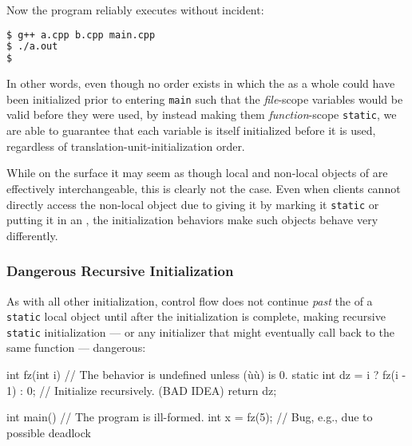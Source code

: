\noindent Now the program reliably executes without incident:

\begin{lstlisting}[language=bash]
$ g++ a.cpp b.cpp main.cpp
$ ./a.out
$
\end{lstlisting}

\noindent In other words, even though no order exists in which the 
as a whole could have been initialized prior to entering
\lstinline!main! such that the \emph{file}-scope variables
would be valid before they were used, by instead making them
\emph{function}-scope \lstinline!static!, we are able to guarantee that
each variable is itself initialized before it is used, regardless of
translation-unit-initialization order.

While on the surface it may seem as though local and non-local objects of 
are effectively interchangeable, this is clearly not the case.  Even when
clients cannot directly access the non-local object due to giving it
 by marking it \lstinline!static! or putting it in an ,
the initialization behaviors make such objects behave very differently.

\subsubsection[Dangerous Recursive Initialization]{Dangerous Recursive Initialization}\label{dangerous-recursive-initialization}

As with all other initialization, control flow does not continue
\emph{past} the  of a \lstinline!static! local object until
after the initialization is complete, making recursive \lstinline!static!
initialization --- or any initializer that might eventually call back to the same function --- dangerous:

\begin{emcppslisting}
int fz(int i)  // The behavior is undefined unless (ù{}ù) is 0.
{
    static int dz = i ? fz(i - 1) : 0;  // Initialize recursively. (BAD IDEA)
    return dz;
}

int main()  // The program is ill-formed.
{
    int x = fz(5);  // Bug, e.g., due to possible deadlock
}
\end{emcppslisting}


